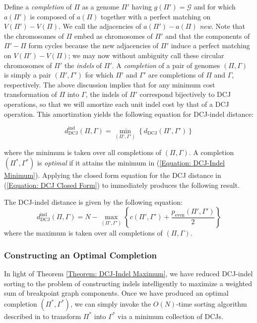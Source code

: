 Define a {\em completion} of $\Pi$ as a genome $\Pi'$ having $g(\Pi') = \mathcal{G}$ and for which $a(\Pi')$ is composed of $a(\Pi)$ together with a perfect matching on $V(\Pi') - V(\Pi)$.  We call the adjacencies of $a(\Pi') - a(\Pi)$ {\em new}.  Note that the chromosomes of $\Pi$ embed as chromosomes of $\Pi'$ and that the components of $\Pi' - \Pi$ form cycles because the new adjacencies of $\Pi'$ induce a perfect matching on $V(\Pi') - V(\Pi)$; we may now without ambiguity call these circular chromosomes of $\Pi'$ the {\em indels} of $\Pi'$.   A {\em completion} of a pair of genomes $(\Pi, \Gamma)$ is simply a pair $(\Pi', \Gamma')$ for which $\Pi'$ and $\Gamma'$ are completions of $\Pi$ and $\Gamma$, respectively.  The above discussion implies that for any minimum cost transformation of $\Pi$ into $\Gamma$, the indels of $\Pi'$ correspond bijectively to DCJ operations, so that we will amortize each unit indel cost by that of a DCJ operation.  This amortization yields the following equation for DCJ-indel distance:

\begin{equation}
d^{\mathrm{ind}}_{\mathrm{DCJ}}(\Pi, \Gamma) = \min_{(\Pi', \Gamma')}\left\{{{ d_{\mathrm{DCJ}}(\Pi', \Gamma')}}\right\}
\label{Equation: DCJ-Indel Minimum}
\end{equation}

\noindent where the minimum is taken over all completions of $(\Pi, \Gamma)$.  A completion $(\Pi^*, \Gamma^*)$ is {\em optimal} if it attains the minimum in (\ref{Equation: DCJ-Indel Minimum}).  Applying the closed form equation for the DCJ distance  in (\ref{Equation: DCJ Closed Form}) to immediately produces the following result.

\begin{theorem}
The DCJ-indel distance is given by the following equation:
\begin{equation}
d^{\mathrm{ind}}_{\mathrm{DCJ}}(\Pi, \Gamma) = N - \max_{(\Pi', \Gamma')}{\left\{c(\Pi', \Gamma') + \frac{p_{\mathrm{even}}(\Pi', \Gamma')}{2}\right\}}
\label{Equation: DCJ-Indel Maximum I}
\end{equation}
where the maximum is taken over all completions of $(\Pi, \Gamma)$. 
\label{Theorem: DCJ-Indel Maximum}
\end{theorem}

\subsubsection*{Constructing an Optimal Completion}
In light of Theorem \ref{Theorem: DCJ-Indel Maximum}, we have reduced DCJ-indel sorting to the problem of constructing indels intelligently to maximize a weighted sum of breakpoint graph components.  Once we have produced an optimal completion $(\Pi^*, \Gamma^*)$, we can simply invoke the $O(N)$-time sorting algorithm described in \cite{bergeron} to transform $\Pi^*$ into $\Gamma^*$ via a minimum collection of DCJs.

